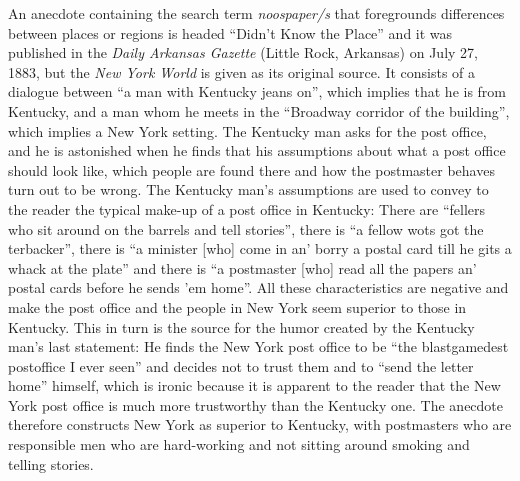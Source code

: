An anecdote containing the search term \emph{noospaper/s} that foregrounds differences between places or regions is headed “Didn’t Know the Place” and it was published in the \emph{Daily Arkansas Gazette} (Little Rock, Arkansas) on July 27, 1883, but the \emph{New York World} is given as its original source. It consists of a dialogue between “a man with Kentucky jeans on”, which implies that he is from Kentucky, and a man whom he meets in the “Broadway corridor of the building”, which implies a New York setting. The Kentucky man asks for the post office, and he is astonished when he finds that his assumptions about what a post office should look like, which people are found there and how the postmaster behaves turn out to be wrong. The Kentucky man’s assumptions are used to convey to the reader the typical make-up of a post office in Kentucky: There are “fellers who sit around on the barrels and tell stories”, there is “a fellow wots got the terbacker”, there is “a minister [who] come in an’ borry a postal card till he gits a whack at the plate” and there is “a postmaster [who] read all the papers an’ postal cards before he sends ’em home”. All these characteristics are negative and make the post office and the people in New York seem superior to those in Kentucky. This in turn is the source for the humor created by the Kentucky man’s last statement: He finds the New York post office to be “the blastgamedest postoffice I ever seen” and decides not to trust them and to “send the letter home” himself, which is ironic because it is apparent to the reader that the New York post office is much more trustworthy than the Kentucky one. The anecdote therefore constructs New York as superior to Kentucky, with postmasters who are responsible men who are hard-working and not sitting around smoking and telling stories.

